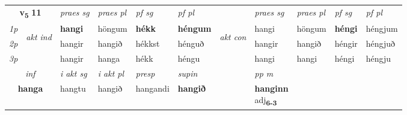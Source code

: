 \noindent
\begin{tabular}{lllllllllll} \toprule
\multicolumn{2}{c}{\textbf{v{\textsubscript{5}}} \Large{\textbf{11}}}  &  \textit{praes sg}  & \textit{praes pl}  &\textit{ pf sg} & \textit{pf pl} &  &  \textit{praes sg}  & \textit{praes pl}  & \textit{pf sg} & \textit{pf pl } \\*
	\cmidrule{3-6} \cmidrule{8-11}
 {\textit{1p}} & \multirow{3}{*}{\begin{turn}{90}\textit{akt ind}\end{turn}} & \textbf{hangi} & höngum & \textbf{hékk} & \textbf{héngum} & \multirow{3}{*}{\begin{turn}{90}\textit{akt con}\end{turn}} &hangi & höngum & \textbf{héngi} & héngjum\\*
 {\textit{2p}} &  &  hangir  & hangið & hékkst & hénguð & & hangir & hangið & héngir & héngjuð \\*
{\textit{3p}} &  & hangir & hanga & hékk & héngu & & hangi & hangi& héngi & héngju \\*
\cmidrule{3-6} \cmidrule{8-11}

   \multicolumn{2}{c}{\textit{inf}}  & \textit{i akt sg} & \textit{i akt pl}   & \textit{presp} & \textit{supin}  && \textit{pp m} \\*
  \multicolumn{2}{c}{\textbf{hanga}} & hangtu  & hangið   & hangandi &  \textbf{hangið}  && \specialcell{\textbf{hanginn} \\ adj\textbf{\textsubscript{6-3}}} \\*
\end{tabular}

